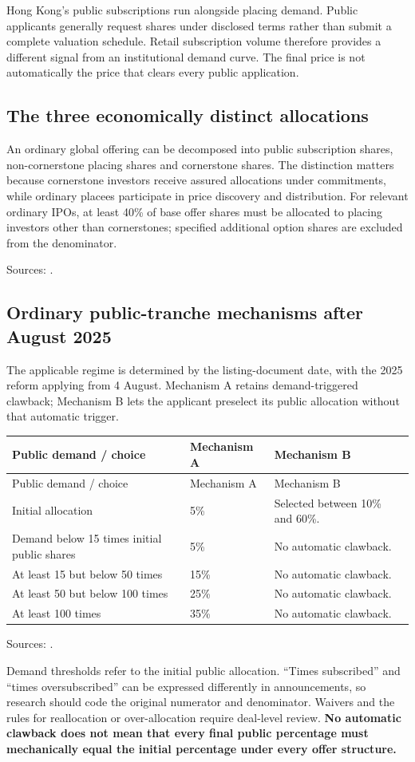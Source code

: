 \documentclass[11pt,a4paper]{article}
\newcommand{\source}[1]{\par{\footnotesize\color{ink}Sources: \cite{#1}.}\par}
\begin{document}
Hong Kong's public subscriptions run alongside placing demand. Public applicants generally request shares under disclosed terms rather than submit a complete valuation schedule. Retail subscription volume therefore provides a different signal from an institutional demand curve. The final price is not automatically the price that clears every public application.

\subsection{The three economically distinct allocations}
An ordinary global offering can be decomposed into public subscription shares, non-cornerstone placing shares and cornerstone shares. The distinction matters because cornerstone investors receive assured allocations under commitments, while ordinary placees participate in price discovery and distribution. For relevant ordinary IPOs, at least 40\% of base offer shares must be allocated to placing investors other than cornerstones; specified additional option shares are excluded from the denominator.\source{pn18}

\subsection{Ordinary public-tranche mechanisms after August 2025}
The applicable regime is determined by the listing-document date, with the 2025 reform applying from 4 August. Mechanism A retains demand-triggered clawback; Mechanism B lets the applicant preselect its public allocation without that automatic trigger.
\begin{longtable}{@{}L{5.1cm}L{4.4cm}L{6.0cm}@{}}
\toprule Public demand / choice & Mechanism A & Mechanism B\\\midrule\endfirsthead
\toprule Public demand / choice & Mechanism A & Mechanism B\\\midrule\endhead
Initial allocation & 5\% & Selected between 10\% and 60\%.\\
Demand below 15 times initial public shares & 5\% & No automatic clawback.\\
At least 15 but below 50 times & 15\% & No automatic clawback.\\
At least 50 but below 100 times & 25\% & No automatic clawback.\\
At least 100 times & 35\% & No automatic clawback.\\
\bottomrule
\end{longtable}
\source{ipo2025}
Demand thresholds refer to the initial public allocation. ``Times subscribed'' and ``times oversubscribed'' can be expressed differently in announcements, so research should code the original numerator and denominator. Waivers and the rules for reallocation or over-allocation require deal-level review. \textbf{No automatic clawback does not mean that every final public percentage must mechanically equal the initial percentage under every offer structure.}
\end{document}
